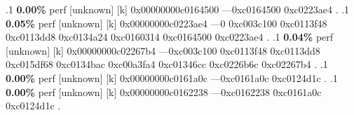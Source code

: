 \begin{profile}
{.1 \textbf{ 0.00\%} perf             [unknown]              [k] 0x00000000c0164500\newline {} ---0xc0164500\newline {} 0xc0223ae4\newline {} . 
.1 \textbf{ 0.05\%} perf             [unknown]              [k] 0x00000000c0223ae4\newline {} ---0\newline {} 0xc003c100\newline {} 0xc0113f48\newline {} 0xc0113dd8\newline {} 0xc0134a24\newline {} 0xc0160314\newline {} 0xc0164500\newline {} 0xc0223ae4\newline {} . 
.1 \textbf{ 0.04\%} perf             [unknown]              [k] 0x00000000c02267b4\newline {} ---0xc003c100\newline {} 0xc0113f48\newline {} 0xc0113dd8\newline {} 0xc015df68\newline {} 0xc0134bac\newline {} 0xc00a3fa4\newline {} 0xc01346cc\newline {} 0xc0226b6c\newline {} 0xc02267b4\newline {} . 
.1 \textbf{ 0.00\%} perf             [unknown]              [k] 0x00000000c0161a0c\newline {} ---0xc0161a0c\newline {} 0xc0124d1c\newline {} . 
.1 \textbf{ 0.00\%} perf             [unknown]              [k] 0x00000000c0162238\newline {} ---0xc0162238\newline {} 0xc0161a0c\newline {} 0xc0124d1c\newline {} . 
}
\end{profile}
